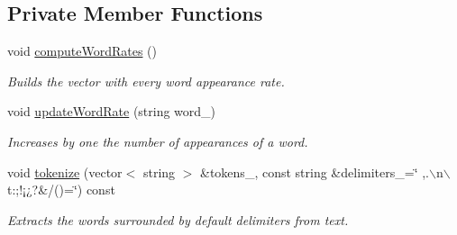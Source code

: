 \subsection*{Private Member Functions}
\begin{CompactItemize}
\item 
void \hyperlink{class_text_8239e13039bcc1c713f66f1236693706}{computeWordRates} ()
\begin{CompactList}\small\item\em Builds the vector with every word appearance rate. \item\end{CompactList}\item 
void \hyperlink{class_text_7c2b1a540b470cb7aa37fb42070a674f}{updateWordRate} (string word\_\-)
\begin{CompactList}\small\item\em Increases by one the number of appearances of a word. \item\end{CompactList}\item 
void \hyperlink{class_text_09f6b1e475da423ac81305500e05c7d6}{tokenize} (vector$<$ string $>$ \&tokens\_\-, const string \&delimiters\_\-=\char`\"{} ,.$\backslash$n$\backslash$t:;!¡¿?\&/()=\char`\"{}) const 
\begin{CompactList}\small\item\em Extracts the words surrounded by default delimiters from text. \item\end{CompactList}\end{CompactItemize}
